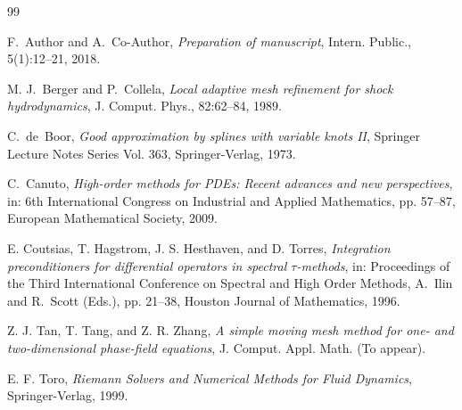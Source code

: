 \documentclass[mathpazo]{csiam-am}
\begin{document}
\begin{thebibliography}{99}

F.~Author and A.~Co-Author, \emph{Preparation of manuscript}, Intern. Public.,  5(1):12--21, 2018.

 M. J.~Berger and P.~Collela, {\em Local adaptive mesh
refinement for shock hydrodynamics}, J. Comput. Phys.,  82:62--84, 1989.


C.~de~Boor, {\em Good approximation by splines with variable knots II}, Springer Lecture  Notes Series Vol. 363, Springer-Verlag, 1973.

C.~Canuto, {\em High-order methods for {PDE}s: Recent advances and new perspectives},
 in:    6th {I}nternational {C}ongress on {I}ndustrial  and {A}pplied {M}athematics, pp. 57--87,
 European Mathematical Society, 2009.

E. Coutsias, T. Hagstrom, J. S. Hesthaven, and D. Torres,
 \emph{Integration preconditioners for differential operators in spectral
  $\tau$-methods},
 in:   Proceedings of the Third International Conference on Spectral
  and High Order Methods, A.~Ilin and R.~Scott (Eds.), pp. 21--38,  Houston Journal of Mathematics, 1996.


Z. J. Tan, T. Tang, and Z. R. Zhang, {\em A simple moving mesh method for one- and two-dimensional phase-field equations}, J. Comput. Appl. Math. (To appear).

 E. F. Toro,  \emph{Riemann Solvers and Numerical Methods for Fluid Dynamics}, Springer-Verlag, 1999.
\end{thebibliography}
\end{document}
